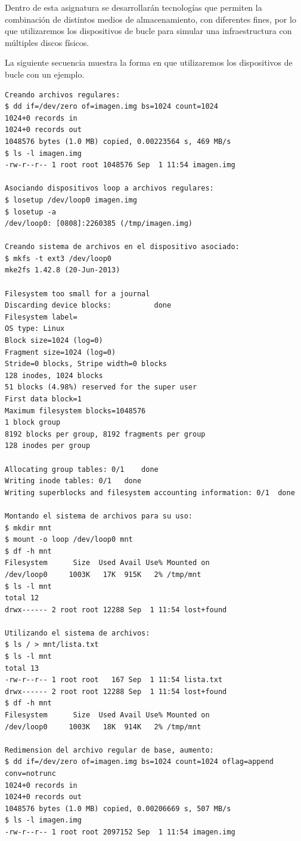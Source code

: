 Dentro de esta asignatura se desarrollarán tecnologías que permiten la 
combinación de distintos medios de almacenamiento, con diferentes fines, 
por lo que utilizaremos los dispositivos de bucle para simular una 
infraestructura con múltiples discos físicos. 

La siguiente secuencia muestra la forma en que utilizaremos los dispositivos
de bucle con un ejemplo.

\begin{lstlisting}
Creando archivos regulares: 
$ dd if=/dev/zero of=imagen.img bs=1024 count=1024
1024+0 records in
1024+0 records out
1048576 bytes (1.0 MB) copied, 0.00223564 s, 469 MB/s
$ ls -l imagen.img
-rw-r--r-- 1 root root 1048576 Sep  1 11:54 imagen.img

Asociando dispositivos loop a archivos regulares: 
$ losetup /dev/loop0 imagen.img
$ losetup -a
/dev/loop0: [0808]:2260385 (/tmp/imagen.img)

Creando sistema de archivos en el dispositivo asociado: 
$ mkfs -t ext3 /dev/loop0
mke2fs 1.42.8 (20-Jun-2013)

Filesystem too small for a journal
Discarding device blocks:          done                            
Filesystem label=
OS type: Linux
Block size=1024 (log=0)
Fragment size=1024 (log=0)
Stride=0 blocks, Stripe width=0 blocks
128 inodes, 1024 blocks
51 blocks (4.98%) reserved for the super user
First data block=1
Maximum filesystem blocks=1048576
1 block group
8192 blocks per group, 8192 fragments per group
128 inodes per group

Allocating group tables: 0/1	done                            
Writing inode tables: 0/1	done                            
Writing superblocks and filesystem accounting information: 0/1	done

Montando el sistema de archivos para su uso: 
$ mkdir mnt
$ mount -o loop /dev/loop0 mnt
$ df -h mnt
Filesystem      Size  Used Avail Use% Mounted on
/dev/loop0     1003K   17K  915K   2% /tmp/mnt
$ ls -l mnt
total 12
drwx------ 2 root root 12288 Sep  1 11:54 lost+found

Utilizando el sistema de archivos: 
$ ls / > mnt/lista.txt
$ ls -l mnt
total 13
-rw-r--r-- 1 root root   167 Sep  1 11:54 lista.txt
drwx------ 2 root root 12288 Sep  1 11:54 lost+found
$ df -h mnt
Filesystem      Size  Used Avail Use% Mounted on
/dev/loop0     1003K   18K  914K   2% /tmp/mnt

Redimension del archivo regular de base, aumento: 
$ dd if=/dev/zero of=imagen.img bs=1024 count=1024 oflag=append conv=notrunc
1024+0 records in
1024+0 records out
1048576 bytes (1.0 MB) copied, 0.00206669 s, 507 MB/s
$ ls -l imagen.img
-rw-r--r-- 1 root root 2097152 Sep  1 11:54 imagen.img


\end{lstlisting}
